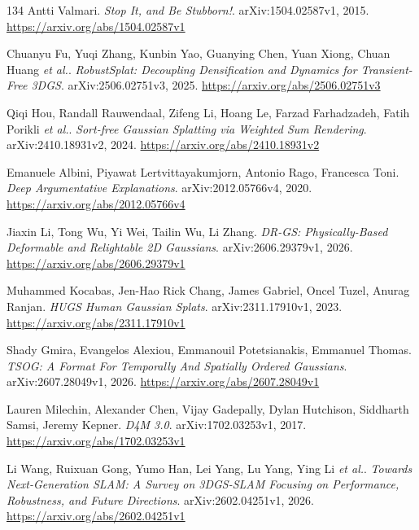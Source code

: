 \documentclass[11pt,a4paper]{article}
\begin{document}
\begin{thebibliography}{134}
Antti Valmari.
\newblock \emph{Stop It, and Be Stubborn!}.
\newblock arXiv:1504.02587v1, 2015.
\newblock \url{https://arxiv.org/abs/1504.02587v1}

Chuanyu Fu, Yuqi Zhang, Kunbin Yao, Guanying Chen, Yuan Xiong, Chuan Huang \emph{et al.}.
\newblock \emph{RobustSplat: Decoupling Densification and Dynamics for Transient-Free 3DGS}.
\newblock arXiv:2506.02751v3, 2025.
\newblock \url{https://arxiv.org/abs/2506.02751v3}

Qiqi Hou, Randall Rauwendaal, Zifeng Li, Hoang Le, Farzad Farhadzadeh, Fatih Porikli \emph{et al.}.
\newblock \emph{Sort-free Gaussian Splatting via Weighted Sum Rendering}.
\newblock arXiv:2410.18931v2, 2024.
\newblock \url{https://arxiv.org/abs/2410.18931v2}

Emanuele Albini, Piyawat Lertvittayakumjorn, Antonio Rago, Francesca Toni.
\newblock \emph{Deep Argumentative Explanations}.
\newblock arXiv:2012.05766v4, 2020.
\newblock \url{https://arxiv.org/abs/2012.05766v4}

Jiaxin Li, Tong Wu, Yi Wei, Tailin Wu, Li Zhang.
\newblock \emph{DR-GS: Physically-Based Deformable and Relightable 2D Gaussians}.
\newblock arXiv:2606.29379v1, 2026.
\newblock \url{https://arxiv.org/abs/2606.29379v1}

Muhammed Kocabas, Jen-Hao Rick Chang, James Gabriel, Oncel Tuzel, Anurag Ranjan.
\newblock \emph{HUGS Human Gaussian Splats}.
\newblock arXiv:2311.17910v1, 2023.
\newblock \url{https://arxiv.org/abs/2311.17910v1}

Shady Gmira, Evangelos Alexiou, Emmanouil Potetsianakis, Emmanuel Thomas.
\newblock \emph{TSOG: A Format For Temporally And Spatially Ordered Gaussians}.
\newblock arXiv:2607.28049v1, 2026.
\newblock \url{https://arxiv.org/abs/2607.28049v1}

Lauren Milechin, Alexander Chen, Vijay Gadepally, Dylan Hutchison, Siddharth Samsi, Jeremy Kepner.
\newblock \emph{D4M 3.0}.
\newblock arXiv:1702.03253v1, 2017.
\newblock \url{https://arxiv.org/abs/1702.03253v1}

Li Wang, Ruixuan Gong, Yumo Han, Lei Yang, Lu Yang, Ying Li \emph{et al.}.
\newblock \emph{Towards Next-Generation SLAM: A Survey on 3DGS-SLAM Focusing on Performance, Robustness, and Future Directions}.
\newblock arXiv:2602.04251v1, 2026.
\newblock \url{https://arxiv.org/abs/2602.04251v1}


\end{thebibliography}
\end{document}
